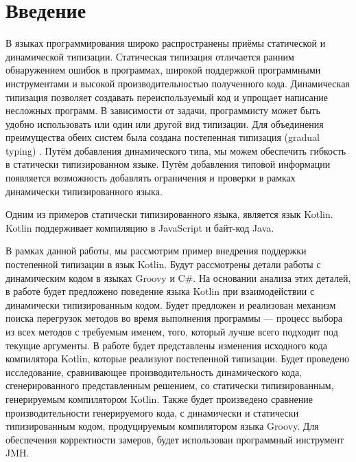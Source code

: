\section*{Введение}

В языках программирования широко распространены приёмы статической и динамической типизации. Статическая типизация отличается ранним обнаружением ошибок в программах, широкой поддержкой программными инструментами и высокой производительностью полученного кода. Динамическая типизация позволяет создавать переиспользуемый код и упрощает написание несложных программ. 
В зависимости от задачи, программисту может быть удобно использовать или один или другой вид типизации. Для объединения преимущества обеих систем была создана постепенная типизация (gradual typing) \cite{gradual:siek2006gradual}. Путём добавления динамического типа, мы можем обеспечить гибкость в статически типизированном языке. Путём добавления типовой информации появляется возможность добавлять ограничения и проверки в рамках динамически типизированного языка.

Одним из примеров статически типизированного языка, является язык Kotlin. 
Kotlin поддерживает компиляцию в JavaScript и байт-код Java.

В рамках данной работы, мы рассмотрим пример внедрения поддержки постепенной типизации в язык Kotlin. Будут рассмотрены детали работы с динамическим кодом в языках Groovy и C\#. На основании анализа этих деталей, в работе будет предложено поведение языка Kotlin при взаимодействии с динамически типизированным кодом. Будет предложен и реализован механизм поиска перегрузок методов во время выполнения программы --- процесс выбора из всех методов с требуемым именем, того, который лучше всего подходит под текущие аргументы. В работе будет представлены изменения исходного кода компилятора Kotlin, которые реализуют постепенной типизации. Будет проведено исследование, сравнивающее производительность динамического кода, сгенерированного представленным решением, со статически типизированным, генерируемым компилятором Kotlin. Также будет произведено сравнение производительности генерируемого кода, с динамически и статически типизированным кодом, продуцируемым компилятором языка Groovy. Для обеспечения корректности замеров, будет использован программный инструмент JMH.



